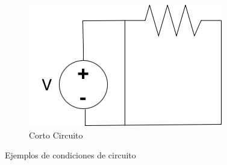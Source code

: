 \begin{figure}
     \begin{subfigure}{0.3\textwidth}
             \centering
             \includegraphics[width=\textwidth]{images/C01/CortoCircuito.png}
         \caption{Corto Circuito}
         \label{fig:CortoCirc}
     \end{subfigure}
     
     
     
     
     
        \caption{Ejemplos de condiciones de circuito}
        \label{fig:three graphs}
\end{figure}

    
    
    
    
        


